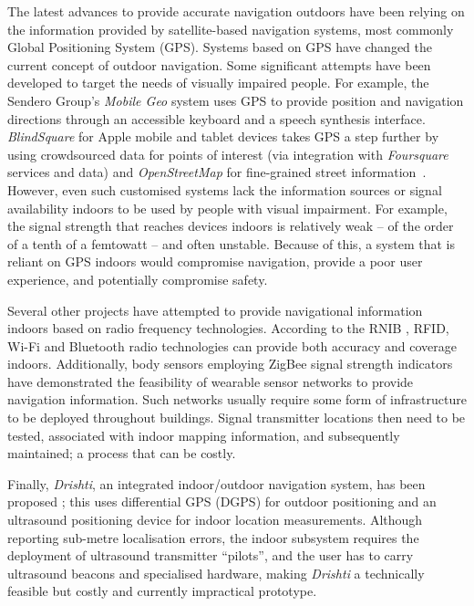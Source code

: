 The latest advances to provide accurate navigation outdoors have been relying on the information provided by satellite-based navigation systems, most commonly Global Positioning System (GPS). Systems based on GPS have changed the current concept of outdoor navigation. Some significant attempts have been developed to target the needs of visually impaired people. For example, the Sendero Group's  \textit{Mobile Geo} \citep{senderoSeeingEye} system uses GPS to provide position and navigation directions through an accessible keyboard and a speech synthesis interface. \textit{BlindSquare} for Apple mobile and tablet devices takes GPS a step further by using crowdsourced data for points of interest (via integration with \textit{Foursquare} services and data) and \textit{OpenStreetMap} for fine-grained street information~\citep{blindSquare}. However, even such customised systems lack the information sources or signal availability indoors to be used by people with visual impairment. For example, the signal strength that reaches devices indoors is relatively weak -- of the order of a tenth of a femtowatt \citep{warner2003gps} -- and often unstable.  Because of this, a system that is reliant on GPS indoors would compromise navigation, provide a poor user experience, and potentially compromise safety.

Several other projects have attempted to provide navigational information indoors based on radio frequency technologies. According to the RNIB \citep{Worsfold2010}, RFID, Wi-Fi and Bluetooth radio technologies can provide both accuracy and coverage indoors. Additionally, body sensors employing ZigBee signal strength indicators\citep{dong2012mapping} have demonstrated the feasibility of wearable sensor networks to provide navigation information. Such networks usually require some form of infrastructure to be deployed throughout buildings. Signal transmitter locations then need to be tested, associated with indoor mapping information, and subsequently maintained; a process that can be costly.

Finally, \textit{Drishti}, an integrated indoor/outdoor navigation system, has been proposed \citep{ran2004drishti}; this uses differential GPS (DGPS) for outdoor positioning and an ultrasound positioning device for indoor location measurements. Although reporting sub\--me\-tre localisation errors, the indoor subsystem requires the deployment of ultrasound transmitter ``pilots'', and the user has to carry ultrasound beacons and specialised hardware, making  \textit{Drishti} a technically feasible but costly and currently impractical prototype.

